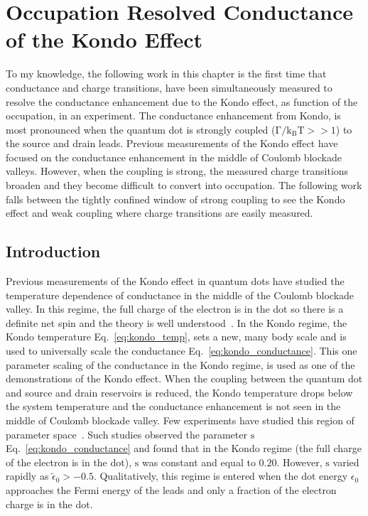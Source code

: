 \chapter[Occupation Resolved Conductance of the Kondo Effect]{Occupation Resolved Conductance of the Kondo Effect}\label{cha:mixed_valence_conductance}


To my knowledge, the following work in this chapter is the first time that conductance and charge transitions, have been simultaneously measured to resolve the conductance enhancement due to the Kondo effect, as function of the occupation, in an experiment. The conductance enhancement from Kondo, is most pronounced when the quantum dot is strongly coupled ($\mathrm{\Gamma/k_BT}>>1$) to the source and drain leads. Previous measurements of the Kondo effect have focused on the conductance enhancement in the middle of Coulomb blockade valleys. However, when the coupling is strong, the measured charge transitions broaden and they become difficult to convert into occupation. The following work falls between the tightly confined window of strong coupling to see the Kondo effect and weak coupling where charge transitions are easily measured. 

\section{Introduction}
Previous measurements of the Kondo effect in quantum dots have studied the temperature dependence of conductance in the middle of the Coulomb blockade valley. In this regime, the full charge of the electron is in the dot so there is a definite net spin and the theory is well understood~\cite{kondo_unitary, costi_kondo_mv_eo_regime}. In the Kondo regime, the Kondo temperature Eq.~\ref{eq:kondo_temp}, sets a new, many body scale and is used to universally scale the conductance Eq.~\ref{eq:kondo_conductance}. This one parameter scaling of the conductance in the Kondo regime, is used as one of the demonstrations of the Kondo effect. When the coupling between the quantum dot and source and drain reservoirs is reduced, the Kondo temperature drops below the system temperature and the conductance enhancement is not seen in the middle of Coulomb blockade valley. Few experiments have studied this region of parameter space~\cite{goldhaber_mv}. Such studies observed the parameter $\mathrm{s}$ Eq.~\ref{eq:kondo_conductance} and found that in the Kondo regime (the full charge of the electron is in the dot), $\mathrm{s}$ was constant and equal to $0.20$. However, $\mathrm{s}$ varied rapidly as $\tilde{\epsilon}_0>-0.5$. Qualitatively, this regime is entered when the dot energy $\epsilon_0$ approaches the Fermi energy of the leads and only a fraction of the electron charge is in the dot. 



